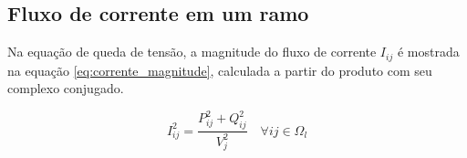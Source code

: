 \subsection{Fluxo de corrente em um ramo}

Na equação de queda de tensão, a magnitude do fluxo de corrente $I_{ij}$ é mostrada na equação \ref{eq:corrente_magnitude}, calculada a partir do produto com seu complexo conjugado.

\begin{equation}
    I_{ij}^{2} = \frac{P_{ij}^{2}+Q_{ij}^{2}}{V_{j}^{2}}\quad\forall ij \in \Omega_{l}
    \label{eq:corrente_magnitude}
\end{equation}
